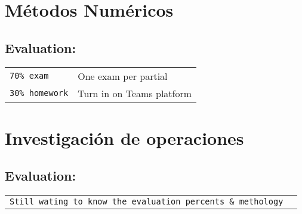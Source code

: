\documentclass{article}
\begin{document}
    \section{Métodos Numéricos}
        \subsection{Evaluation:}
        \begin{tabular}{ll}
            \texttt{70\% exam} & One exam per partial \\
            \texttt{30\% homework} & Turn in on Teams platform \\
        \end{tabular}


    \section{Investigación de operaciones}
        \subsection{Evaluation:}
        \begin{tabular}{ll}
            \texttt{Still wating to know the evaluation percents \& methology}
        \end{tabular}
\end{document}
